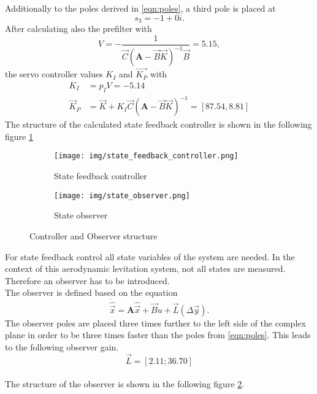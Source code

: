 Additionally to the poles derived in \ref{eqn:poles}, a third pole is placed at
\begin{equation}
    s_3 = -1 + 0i.
\end{equation}
After calculating also the prefilter with 
\begin{equation}
    V=-\frac{1}{\vec{C}(\mathbf{A}-\vec{B} \vec{K})^{-1} \vec{B}} = 5.15,
\end{equation}
the servo controller values $K_I$ and $\vec{K_P}$ with
\begin{equation}
    \begin{aligned}
        K_I & =p_I V = -5.14\\
        \vec{K}_P & =\vec{K}+K_I \vec{C}(\boldsymbol{A}-\vec{B} \vec{K})^{-1} = [87.54, 8.81]
    \end{aligned}
\end{equation}
The structure of the calculated state feedback controller is shown  in the following figure \ref{fig:sfc}
\begin{figure}[!h]
    \begin{subfigure}{0.5\textwidth}
        \centering
        \texttt{[image: img/state\_feedback\_controller.png]}
        \caption[State feedback controller ]{State feedback controller\cite{ACE}}
        \label{fig:sfc}
    \end{subfigure}
    \begin{subfigure}{0.5\textwidth}
        \centering
        \texttt{[image: img/state\_observer.png]}
        \caption[State observer ]{State observer \cite{ACE}}
        \label{fig:obs}
    \end{subfigure}
    \label{fig:sfc_obs}
    \caption{Controller and Observer structure}
\end{figure}

For state feedback control  all state variables of the system are needed. In the context of this aerodynamic levitation system, not all states are measured. Therefore an observer has to be introduced. 
\\The observer is defined based on the equation
\begin{equation}
    \dot{\hat{\vec{x}}}=\mathbf{A} \hat{\vec{x}}+\vec{B} u+\vec{L}(\Delta\vec{y}).
\end{equation}
The observer poles are placed three times further to the left side of the complex plane in order to be three times faster than the poles from \ref{eqn:poles}. This leads to the following observer gain.  
\begin{equation}
    \vec{L} = [2.11; 36.70]
\end{equation}
\\ The structure of the observer is shown in the following figure \ref{fig:obs}. 

